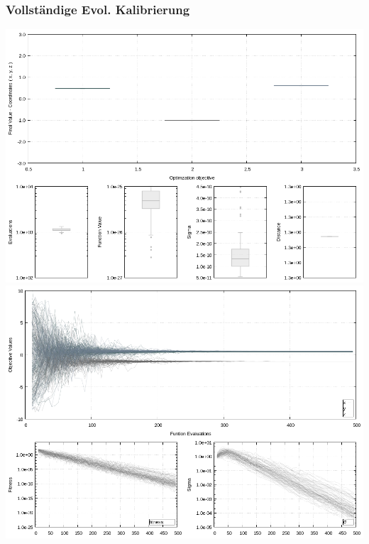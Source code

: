 \begin{frame}[noframenumbering]
  \frametitle{Vollständige Evol. Kalibrierung}
  \begin{center}
  \includegraphics[width=.47\textwidth]{../img/calibration_ant0-boxes.png}
  \qquad
  \includegraphics[width=.47\textwidth]{../img/calibration_ant0-lines.png}
  \end{center}
\end{frame}
